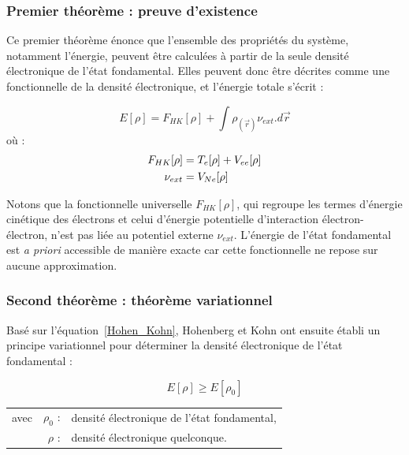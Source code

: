 	\subsubsection{Premier théorème : preuve d'existence}
	
	Ce premier théorème énonce que l'ensemble des propriétés du système, notamment l'énergie, peuvent être calculées à partir de la seule densité électronique de l'état fondamental. Elles peuvent donc être décrites comme une fonctionnelle de la densité électronique, et l'énergie totale s'écrit :
	
	\begin{equation}
	E[\rho] = F_{HK}[\rho] + \int \rho_{(\vec{r})} \nu_{ext} .d\vec{r}
	\label{Hohen_Kohn}
	\end{equation}
	\noindent où :
	\begin{align}
	F_{HK}[\rho] &= T_{e}[\rho] + V_{ee}[\rho] \\
	\nu_{ext} &= V_{Ne}[\rho] \notag
	\end{align}
	
	Notons que la fonctionnelle universelle $F_{HK}[\rho]$, qui regroupe les termes d'énergie cinétique des électrons et celui d'énergie potentielle d'interaction électron-électron, n'est pas liée au potentiel externe $\nu_{ext}$. L'énergie de l'état fondamental est \textit{a priori} accessible de manière exacte car cette fonctionnelle ne repose sur aucune approximation.
	
	\subsubsection{Second théorème : théorème variationnel}
	
	Basé sur l'équation~\ref{Hohen_Kohn}, Hohenberg et Kohn ont ensuite établi un principe variationnel pour déterminer la densité électronique de l'état fondamental :
	
	\begin{equation}
	E[\rho] \geq E[\rho_{0}]
	\end{equation}
	
	\begin{flushleft}
		\begin{tabular}{@{}lrp{10cm}}
			avec & $\rho_{0}$ : & densité électronique de l'état fondamental, \\
			& $\rho$ : & densité électronique quelconque.
		\end{tabular}
	\end{flushleft}
	
